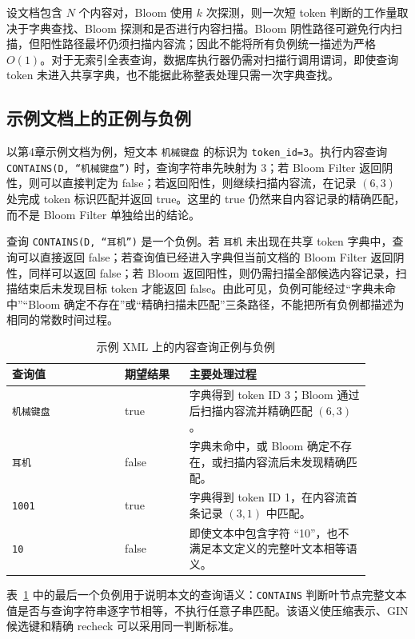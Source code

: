 设文档包含 $N$ 个内容对，Bloom 使用 $k$ 次探测，则一次短 token 判断的工作量取决于字典查找、Bloom 探测和是否进行内容扫描。Bloom 阴性路径可避免行内扫描，但阳性路径最坏仍须扫描内容流；因此不能将所有负例统一描述为严格 $O(1)$。对于无索引全表查询，数据库执行器仍需对扫描行调用谓词，即使查询 token 未进入共享字典，也不能据此称整表处理只需一次字典查找。

\subsection{示例文档上的正例与负例}

以第4章示例文档为例，短文本 \texttt{机械键盘} 的标识为 \texttt{token\_id=3}。执行内容查询 \texttt{CONTAINS(D, ``机械键盘'')} 时，查询字符串先映射为 3；若 Bloom Filter 返回阴性，则可以直接判定为 false；若返回阳性，则继续扫描内容流，在记录 $(6,3)$ 处完成 token 标识匹配并返回 true。这里的 true 仍然来自内容记录的精确匹配，而不是 Bloom Filter 单独给出的结论。

查询 \texttt{CONTAINS(D, ``耳机'')} 是一个负例。若 \texttt{耳机} 未出现在共享 token 字典中，查询可以直接返回 false；若查询值已经进入字典但当前文档的 Bloom Filter 返回阴性，同样可以返回 false；若 Bloom 返回阳性，则仍需扫描全部候选内容记录，扫描结束后未发现目标 token 才能返回 false。由此可见，负例可能经过“字典未命中”“Bloom 确定不存在”或“精确扫描未匹配”三条路径，不能把所有负例都描述为相同的常数时间过程。

\begin{table}[htbp]
\centering
\small
\caption{示例 XML 上的内容查询正例与负例}
\label{tab:query-example-content}
\begin{tabular}{p{0.28\linewidth}p{0.16\linewidth}p{0.45\linewidth}}
\toprule
查询值 & 期望结果 & 主要处理过程 \\
\midrule
\texttt{机械键盘} & true & 字典得到 token ID 3；Bloom 通过后扫描内容流并精确匹配 $(6,3)$。 \\
\texttt{耳机} & false & 字典未命中，或 Bloom 确定不存在，或扫描内容流后未发现精确匹配。 \\
\texttt{1001} & true & 字典得到 token ID 1，在内容流首条记录 $(3,1)$ 中匹配。 \\
\texttt{10} & false & 即使文本中包含字符 ``10''，也不满足本文定义的完整叶文本相等语义。 \\
\bottomrule
\end{tabular}
\end{table}

表~\ref{tab:query-example-content} 中的最后一个负例用于说明本文的查询语义：\texttt{CONTAINS} 判断叶节点完整文本值是否与查询字符串逐字节相等，不执行任意子串匹配。该语义使压缩表示、GIN 候选键和精确 recheck 可以采用同一判断标准。

